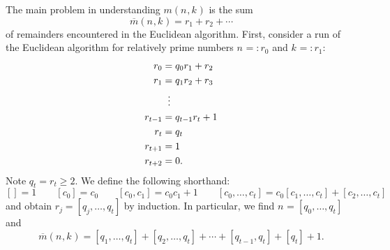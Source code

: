 \documentclass[12pt,a4paper]{article}
\newcommand{\Size}[1][]{n_{#1}}
\newcommand{\Shift}[1][]{k_{#1}}
\newcommand{\MovesOf}[2]{m(#1,#2)}
\newcommand{\RemainderSumOf}[2]{\overline{m}(#1,#2)}
\newcommand{\ExpansionOf}[1]{[#1]}
\newcommand{\Quotient}[1][]{q_{#1}}
\newcommand{\Remainder}[1][]{r_{#1}}
\newcommand{\TheIndex}{j}
\newcommand{\LastIndex}{t}
\newcommand{\Entry}[1][]{c_{#1}}
\begin{document}
  
  The main problem in understanding $\MovesOf{\Size}{\Shift}$ is
  the sum
  \begin{equation}\label{def-mbar}
    \RemainderSumOf{\Size}{\Shift}
    =
    \Remainder[1]+\Remainder[2]+\cdots
  \end{equation}
  of remainders encountered in the Euclidean algorithm.  First,
  consider a run of the Euclidean algorithm for relatively prime numbers
  $\Size=:\Remainder[0]$ and $\Shift=:\Remainder[1]$:
  \begin{align*}
    \Remainder[0] &= \Quotient[0] \Remainder[1] + \Remainder[2] \\
    \Remainder[1] &= \Quotient[1] \Remainder[2] + \Remainder[3] \\
                  &\kern2mm \vdots \\
    \Remainder[\LastIndex-1] &= \Quotient[\LastIndex-1]\Remainder[\LastIndex] + 1 \\
    \Remainder[\LastIndex] &= \Quotient[\LastIndex] \\
    \Remainder[\LastIndex+1] &= 1 \\
    \Remainder[\LastIndex+2] &= 0
                               .
  \end{align*}
  Note $\Quotient[\LastIndex]=\Remainder[\LastIndex]\geq 2$. We define the following shorthand:
  \[
    \ExpansionOf{} = 1\qquad
    \ExpansionOf{\Entry[0]} = \Entry[0]\qquad
    \ExpansionOf{\Entry[0],\Entry[1]} = \Entry[0]\Entry[1] + 1 \qquad
    \ExpansionOf{\Entry[0],\ldots,\Entry[\LastIndex]}
    = \Entry[0]\ExpansionOf{\Entry[1],\ldots,\Entry[\LastIndex]}
    + \ExpansionOf{\Entry[2],\ldots,\Entry[\LastIndex]}
  \]
  and obtain
  \(
    \Remainder[\TheIndex] = \ExpansionOf{\Quotient[\TheIndex],\ldots,\Quotient[\LastIndex]}
  \)
  by induction. In particular, we find
  \(
    \Size = \ExpansionOf{\Quotient[0],\ldots,\Quotient[\LastIndex]}
  \)
  and
  \begin{equation}\label{eq.RemainderSum}
    \RemainderSumOf{\Size}{\Shift}
    =
    \ExpansionOf{\Quotient[1],\ldots,\Quotient[\LastIndex]}
    +
    \ExpansionOf{\Quotient[2],\ldots,\Quotient[\LastIndex]}
    +\cdots+
    \ExpansionOf{\Quotient[\LastIndex-1],\Quotient[\LastIndex]}
    +
    \ExpansionOf{\Quotient[\LastIndex]}
    + 1
    .
  \end{equation}
\end{document}

